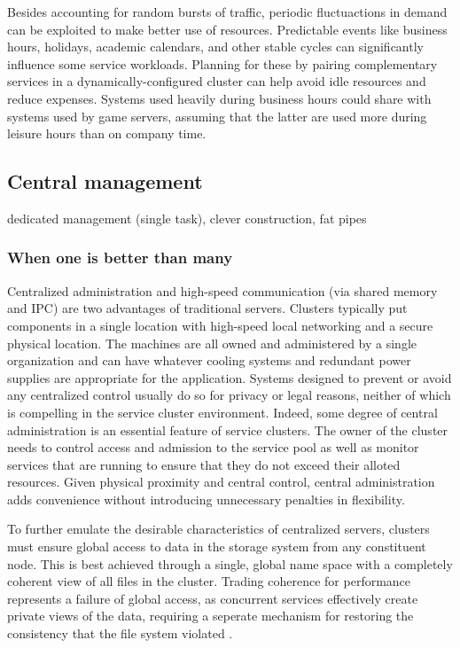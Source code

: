 Besides accounting for random bursts of traffic, periodic fluctuactions in demand can be exploited to make better use of resources. Predictable events like business hours, holidays, academic calendars, and other stable cycles can significantly influence some service workloads. Planning for these by pairing complementary services in a dynamically-configured cluster can help avoid idle resources and reduce expenses. Systems used heavily during business hours could share with systems used by game servers, assuming that the latter are used more during leisure hours than on company time.


\subsection{Central management}

dedicated management (single task), clever construction, fat pipes

\subsubsection{When one is better than many}

Centralized administration and high-speed communication (via shared memory and IPC) are two advantages of traditional servers. Clusters typically put components in a single location with high-speed local networking and a secure physical location. The machines are all owned and administered by a single organization and can have whatever cooling systems and redundant power supplies are appropriate for the application. Systems designed to prevent or avoid any centralized control usually do so for privacy or legal reasons, neither of which is compelling in the service cluster environment. Indeed, some degree of central administration is an essential feature of service clusters. The owner of the cluster needs to control access and admission to the service pool as well as monitor services that are running to ensure that they do not exceed their alloted resources. Given physical proximity and central control, central administration adds convenience without introducing unnecessary penalties in flexibility.

To further emulate the desirable characteristics of centralized servers, clusters must ensure global access to data in the storage system from any constituent node. This is best achieved through a single, global name space with a completely coherent view of all files in the cluster. Trading coherence for performance represents a failure of global access, as concurrent services effectively create private views of the data, requiring a seperate mechanism for restoring the consistency that the file system violated \cite{birrell93}.

